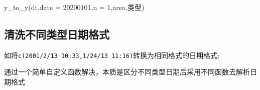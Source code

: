 \documentclass[
]{book}
\newenvironment{Shaded}{\begin{snugshade}}{\end{snugshade}}
\newcommand{\AttributeTok}[1]{\textcolor[rgb]{0.77,0.63,0.00}{#1}}
\newcommand{\DecValTok}[1]{\textcolor[rgb]{0.00,0.00,0.81}{#1}}
\newcommand{\FunctionTok}[1]{\textcolor[rgb]{0.00,0.00,0.00}{#1}}
\newcommand{\NormalTok}[1]{#1}
\newcommand{\StringTok}[1]{\textcolor[rgb]{0.31,0.60,0.02}{#1}}
\begin{document}
\begin{Shaded}
\begin{Highlighting}[]
\FunctionTok{y\_to\_y}\NormalTok{(dt,}\AttributeTok{date =} \StringTok{\textquotesingle{}20200101\textquotesingle{}}\NormalTok{,}\AttributeTok{n =} \DecValTok{1}\NormalTok{,area,类型)}
\end{Highlighting}
\end{Shaded}

\hypertarget{ux6e05ux6d17ux4e0dux540cux7c7bux578bux65e5ux671fux683cux5f0f}{%
\subsection{清洗不同类型日期格式}\label{ux6e05ux6d17ux4e0dux540cux7c7bux578bux65e5ux671fux683cux5f0f}}

如将\texttt{c(\textquotesingle{}2001/2/13\ 10:33\textquotesingle{},\textquotesingle{}1/24/13\ 11:16\textquotesingle{})}转换为相同格式的日期格式;

通过一个简单自定义函数解决，本质是区分不同类型日期后采用不同函数去解析日期格式
\end{document}

